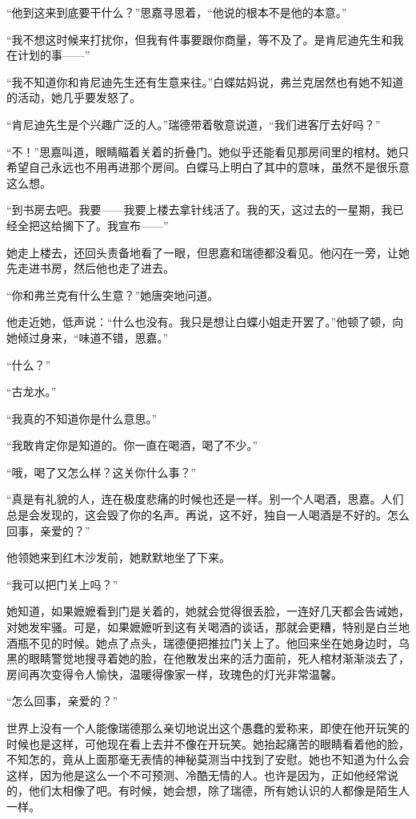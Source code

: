 \par “他到这来到底要干什么？”思嘉寻思着，“他说的根本不是他的本意。”
\par “我不想这时候来打扰你，但我有件事要跟你商量，等不及了。是肯尼迪先生和我在计划的事——”
\par “我不知道你和肯尼迪先生还有生意来往。”白蝶姑妈说，弗兰克居然也有她不知道的活动，她几乎要发怒了。
\par “肯尼迪先生是个兴趣广泛的人。”瑞德带着敬意说道，“我们进客厅去好吗？”
\par “不！”思嘉叫道，眼睛瞄着关着的折叠门。她似乎还能看见那房间里的棺材。她只希望自己永远也不用再进那个房间。白蝶马上明白了其中的意味，虽然不是很乐意这么想。
\par “到书房去吧。我要——我要上楼去拿针线活了。我的天，这过去的一星期，我已经全把这给搁下了。我宣布——”
\par 她走上楼去，还回头责备地看了一眼，但思嘉和瑞德都没看见。他闪在一旁，让她先走进书房，然后他也走了进去。
\par “你和弗兰克有什么生意？”她唐突地问道。
\par 他走近她，低声说：“什么也没有。我只是想让白蝶小姐走开罢了。”他顿了顿，向她倾过身来，“味道不错，思嘉。”
\par “什么？”
\par “古龙水。”
\par “我真的不知道你是什么意思。”
\par “我敢肯定你是知道的。你一直在喝酒，喝了不少。”
\par “哦，喝了又怎么样？这关你什么事？”
\par “真是有礼貌的人，连在极度悲痛的时候也还是一样。别一个人喝酒，思嘉。人们总是会发现的，这会毁了你的名声。再说，这不好，独自一人喝酒是不好的。怎么回事，亲爱的？”
\par 他领她来到红木沙发前，她默默地坐了下来。
\par “我可以把门关上吗？”
\par 她知道，如果嬷嬷看到门是关着的，她就会觉得很丢脸，一连好几天都会告诫她，对她发牢骚。可是，如果嬷嬷听到这有关喝酒的谈话，那就会更糟，特别是白兰地酒瓶不见的时候。她点了点头，瑞德便把推拉门关上了。他回来坐在她身边时，乌黑的眼睛警觉地搜寻着她的脸，在他散发出来的活力面前，死人棺材渐渐淡去了，房间再次变得令人愉快，温暖得像家一样，玫瑰色的灯光非常温馨。
\par “怎么回事，亲爱的？”
\par 世界上没有一个人能像瑞德那么亲切地说出这个愚蠢的爱称来，即使在他开玩笑的时候也是这样，可他现在看上去并不像在开玩笑。她抬起痛苦的眼睛看着他的脸，不知怎的，竟从上面那毫无表情的神秘莫测当中找到了安慰。她也不知道为什么会这样，因为他是这么一个不可预测、冷酷无情的人。也许是因为，正如他经常说的，他们太相像了吧。有时候，她会想，除了瑞德，所有她认识的人都像是陌生人一样。
